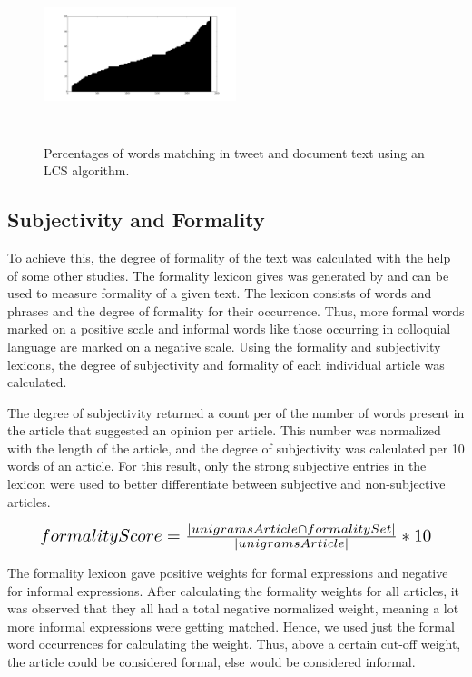 \documentclass[11pt]{article}
\begin{document}
\begin{figure}[htbp]
\centering
\includegraphics[width=0.5\textwidth, height=5cm]{lcs_doc}
\caption{Percentages of words matching in tweet and document text using an LCS algorithm.}
\label{fig:lcs}
\end{figure}



\subsection{Subjectivity and Formality}

To achieve this, the degree of formality of the text was calculated with the help of some other studies. The formality lexicon gives was generated by  and can be used to measure formality of a given text. The lexicon consists of words and phrases and the degree of formality for their occurrence. Thus, more formal words marked on a positive scale and informal words like those occurring in colloquial language are marked on a negative scale. Using the formality and subjectivity lexicons, the degree of subjectivity and formality of each individual article was calculated. 

The degree of subjectivity returned a count per of the number of words present in the article that suggested an opinion per article. This number was normalized with the length of the article, and the degree of subjectivity was calculated per 10 words of an article. For this result, only the strong subjective entries in the lexicon were used to better differentiate between subjective and non-subjective articles.

\begin{equation}
\resizebox{.9\hsize}{!}{$formalityScore = \frac{| unigramsArticle \cap formalitySet |}{| unigramsArticle |} * 10$}
\end{equation}

The formality lexicon gave positive weights for formal expressions and negative for informal expressions. After calculating the formality weights for all articles, it was observed that they all had a total negative normalized weight, meaning a lot more informal expressions were getting matched. Hence, we used just the formal word occurrences for calculating the weight. Thus, above a certain cut-off weight, the article could be considered formal, else would be considered informal.
\end{document}
